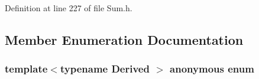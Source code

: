Definition at line 227 of file Sum.\-h.



\subsection{Member Enumeration Documentation}
\hypertarget{structei__sum__impl_3_01_derived_00_01_linear_vectorization_00_01_complete_unrolling_01_4_a562ac99fd327cb5ee83d003fc68a76f9}{\subsubsection[{anonymous enum}]{\setlength{\rightskip}{0pt plus 5cm}template$<$typename Derived $>$ anonymous enum}}\label{structei__sum__impl_3_01_derived_00_01_linear_vectorization_00_01_complete_unrolling_01_4_a562ac99fd327cb5ee83d003fc68a76f9}
